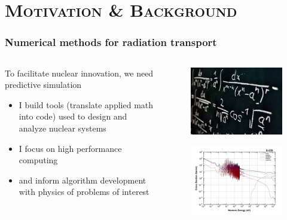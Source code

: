 \documentclass[xcolor=x11names,compress,handout]{beamer}
\renewcommand{\(}{\begin{columns}}
\renewcommand{\)}{\end{columns}}
\newcommand{\<}[1]{\begin{column}{#1}}
\renewcommand{\>}{\end{column}}
\begin{document}
\section{\scshape Motivation \& Background}
\begin{frame}[fragile]
  \frametitle{Numerical methods for radiation transport}

\begin{columns}
  \begin{column}{0.55\textwidth}
  To facilitate nuclear innovation, 
we need predictive simulation
	\begin{itemize}
	\item I build tools (translate applied math into code) used to design and analyze nuclear systems
	\item I focus on high performance computing
	\item and inform algorithm development with physics of problems of interest
	\end{itemize}
  \end{column}
  \begin{column}{0.45\textwidth}
  	\begin{figure}
  	\begin{center}
  		\includegraphics[height=1.in,clip]{../figs/applied-math}\\
		\includegraphics[height=1.5in,clip]{../figs/u235-xsecs}
	\end{center}
  	\end{figure}
  \end{column}
\end{columns}

\end{frame}
\end{document}
